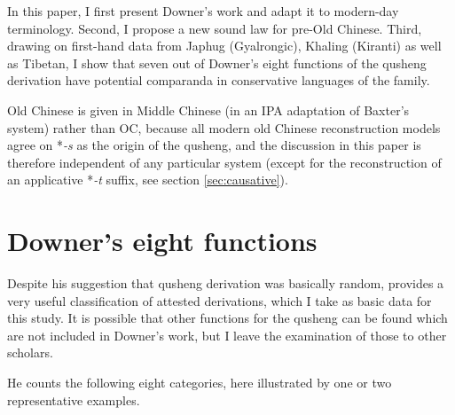 \documentclass[oneside,a4paper,11pt]{article}
\newcommand{\ipa}[1]{{\phon\textit{\mbox{#1}}}}
\begin{document}
In this paper, I first present Downer's work and adapt it to modern-day terminology. Second, I propose a new sound law for pre-Old Chinese. Third, drawing on first-hand data from Japhug (Gyalrongic), Khaling (Kiranti) as well as Tibetan, I show that seven out of Downer's eight functions of the qusheng derivation have potential comparanda in conservative languages of the family.

Old Chinese is given in Middle Chinese (in an IPA adaptation of Baxter's \citeyear{baxter92} system) rather than OC, because all modern old Chinese reconstruction models agree on *\ipa{-s} as the origin of the qusheng, and the discussion in this paper is therefore independent of any particular system (except for the reconstruction of an applicative *\ipa{-t} suffix, see section \ref{sec:causative}).

\section{Downer's eight functions}
Despite his suggestion that qusheng derivation was basically random, \citet{downer59} provides a very useful classification of attested derivations, which I take as basic data for this study. It is possible that other functions for the qusheng can be found which are not included in Downer's work, but I leave the examination of those to other scholars.

He counts the following eight categories, here illustrated by one or two representative examples.
\end{document}
